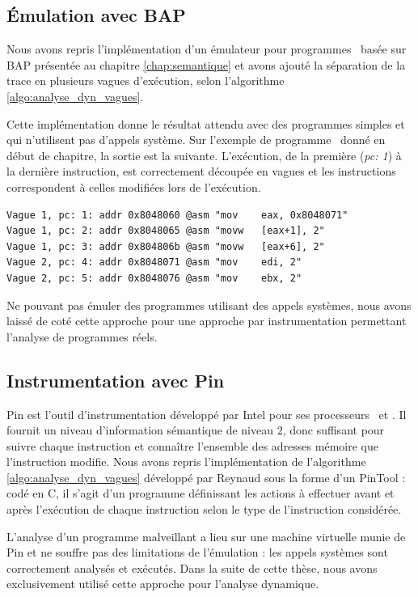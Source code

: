 \subsection{Émulation avec BAP}
Nous avons repris l'implémentation d'un émulateur pour programmes \sms\ basée sur BAP présentée au chapitre \ref{chap:semantique} et avons ajouté la séparation de la trace en plusieurs vagues d'exécution, selon l'algorithme \ref{algo:analyse_dyn_vagues}.

Cette implémentation donne le résultat attendu avec des programmes simples et qui n'utilisent pas d'appels système.
Sur l'exemple de programme \sm\ donné en début de chapitre, la sortie est la suivante.
L'exécution, de la première (\emph{pc: 1}) à la dernière instruction, est correctement découpée en vagues et les instructions correspondent à celles modifiées lors de l'exécution.

\begin{center}
\begin{verbatim}
Vague 1, pc: 1: addr 0x8048060 @asm "mov    eax, 0x8048071"
Vague 1, pc: 2: addr 0x8048065 @asm "movw   [eax+1], 2"
Vague 1, pc: 3: addr 0x804806b @asm "movw   [eax+6], 2"
Vague 2, pc: 4: addr 0x8048071 @asm "mov    edi, 2"
Vague 2, pc: 5: addr 0x8048076 @asm "mov    ebx, 2"
\end{verbatim}
\end{center}

Ne pouvant pas émuler des programmes utilisant des appels systèmes, nous avons laissé de coté cette approche pour une approche par instrumentation permettant l'analyse de programmes réels.


\subsection{Instrumentation avec Pin}
Pin est l'outil d'instrumentation développé par Intel pour ses processeurs \xq\ et \xs.
Il fournit un niveau d'information sémantique de niveau 2, donc suffisant pour suivre chaque instruction et connaître l'ensemble des adresses mémoire que l'instruction modifie. 
Nous avons repris l'implémentation de l'algorithme \ref{algo:analyse_dyn_vagues} développé par Reynaud \cite{Reynaud2010} sous la forme d'un PinTool : codé en C, il s'agit d'un programme définissant les actions à effectuer avant et après l'exécution de chaque instruction selon le type de l'instruction considérée.

L'analyse d'un programme malveillant a lieu sur une machine virtuelle munie de Pin et ne souffre pas des limitations de l'émulation : les appels systèmes sont correctement analysés et exécutés. 
Dans la suite de cette thèse, nous avons exclusivement utilisé cette approche pour l'analyse dynamique.

